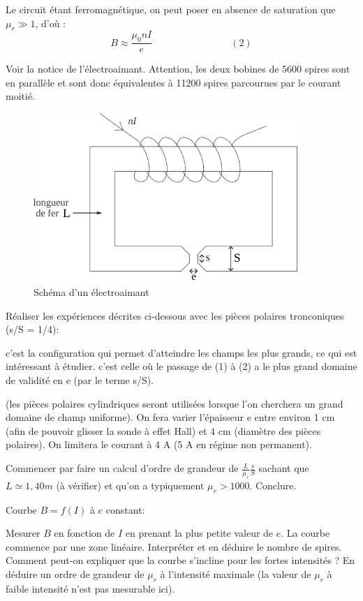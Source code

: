 \documentclass{article}%
\begin{document}
Le circuit étant ferromagnétique, on peut poser en absence de saturation que $\mu_r \gg 1$, d'où :
\[ B \approx \frac{\mu_0 nI}{e} \qquad\qquad\qquad\qquad(2)\]

Voir la notice de l'électroaimant. Attention, les deux bobines de 5600 spires sont en parallèle et sont donc équivalentes à 11200 spires parcourues par le courant moitié.
\begin{figure}
	\centerline{\includegraphics[width=10cm]{images-exp/MagnetismeCircuitMagnetique.png}}
	\caption{Schéma d'un électroaimant}
\end{figure}

Réaliser les expériences décrites ci-dessous avec les pièces polaires tronconiques (s/S = 1/4):

    c'est la configuration qui permet d'atteindre les champs les plus grands, ce qui est intéressant à étudier.
    c'est celle où le passage de (1) à (2) a le plus grand domaine de validité en e (par le terme s/S). 

(les pièces polaires cylindriques seront utilisées lorsque l'on cherchera un grand domaine de champ uniforme). On fera varier l'épaisseur e entre environ 1 cm (afin de pouvoir glisser la sonde à effet Hall) et 4 cm (diamètre des pièces polaires). On limitera le courant à 4 A (5 A en régime non permanent).

Commencer par faire un calcul d'ordre de grandeur de $ \frac{L}{\mu_r}\frac{s}{S}$ sachant que $L \simeq 1,40 m$ (à vérifier) et qu'on a typiquement $\mu_r > 1000$. Conclure.

Courbe $B = f(I)$ à $e$ constant:

Mesurer $B$ en fonction de $I$ en prenant la plus petite valeur de $e$.
La courbe commence par une zone linéaire. Interpréter et en déduire le nombre de spires.
Comment peut-on expliquer que la courbe s'incline pour les fortes intensités ? En déduire un ordre de grandeur de $\mu_r$ à l'intensité maximale (la valeur de $\mu_r$ à faible intensité n'est pas mesurable ici).
\end{document}
